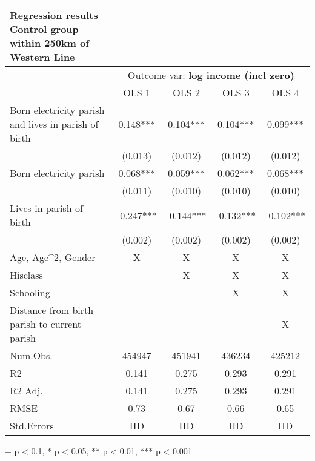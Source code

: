 \setlength{\LTpost}{0mm}
\begin{longtable}{lcccc}
\caption*{
{\large \textbf{Regression results}} \\ 
{\small Control group within 250km of Western Line}
} \\ 
\toprule
 & \multicolumn{4}{c}{Outcome var: \textbf{log income (incl zero)}} \\ 
\cmidrule(lr){2-5}
  & OLS 1 & OLS 2 & OLS 3 & OLS 4 \\ 
\midrule
Born electricity parish and lives in parish of birth & 0.148*** & 0.104*** & 0.104*** & 0.099*** \\ 
 & (0.013) & (0.012) & (0.012) & (0.012) \\ 
Born electricity parish & 0.068*** & 0.059*** & 0.062*** & 0.068*** \\ 
 & (0.011) & (0.010) & (0.010) & (0.010) \\ 
Lives in parish of birth & -0.247*** & -0.144*** & -0.132*** & -0.102*** \\ 
 & (0.002) & (0.002) & (0.002) & (0.002) \\ 
Age, Age\textasciicircum{}2, Gender & X & X & X & X \\ 
Hisclass &  & X & X & X \\ 
Schooling &  &  & X & X \\ 
Distance from birth parish to current parish &  &  &  & X \\ 
Num.Obs. & 454947 & 451941 & 436234 & 425212 \\ 
R2 & 0.141 & 0.275 & 0.293 & 0.291 \\ 
R2 Adj. & 0.141 & 0.275 & 0.293 & 0.291 \\ 
RMSE & 0.73 & 0.67 & 0.66 & 0.65 \\ 
Std.Errors & IID & IID & IID & IID \\ 
\bottomrule
\end{longtable}
\begin{minipage}{\linewidth}
+ p < 0.1, * p < 0.05, ** p < 0.01, *** p < 0.001\\
\end{minipage}

